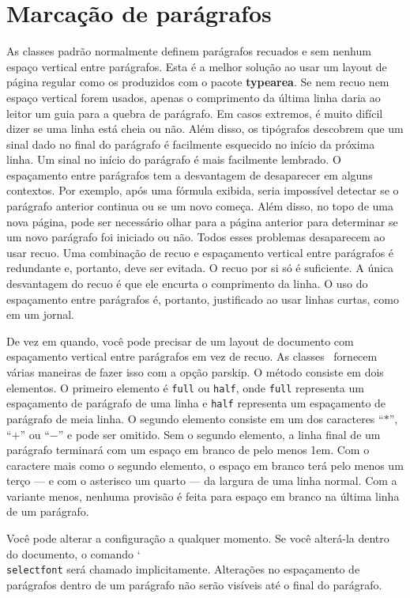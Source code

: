 \chapter{Marcação de parágrafos}
As classes padrão normalmente definem parágrafos recuados e sem nenhum espaço vertical entre parágrafos. Esta é a melhor solução ao usar um layout de página regular como os produzidos com o pacote \textbf{typearea}. Se nem recuo nem espaço vertical forem usados, apenas o comprimento da última linha daria ao leitor um guia para a quebra de parágrafo. Em casos extremos, é muito difícil dizer se uma linha está cheia ou não. Além disso, os tipógrafos descobrem que um sinal dado no final do parágrafo é facilmente esquecido no início da próxima linha. Um sinal no início do parágrafo é mais facilmente lembrado. O espaçamento entre parágrafos tem a desvantagem de desaparecer em alguns contextos. Por exemplo, após uma fórmula exibida, seria impossível detectar se o parágrafo anterior continua ou se um novo começa. Além disso, no topo de uma nova página, pode ser necessário olhar para a página anterior para determinar se um novo parágrafo foi iniciado ou não. Todos esses problemas desaparecem ao usar recuo. Uma combinação de recuo e espaçamento vertical entre parágrafos é redundante e, portanto, deve ser evitada. O recuo por si só é suficiente. A única desvantagem do recuo é que ele encurta o comprimento da linha. O uso do espaçamento entre parágrafos é, portanto, justificado ao usar linhas curtas, como em um jornal.

De vez em quando, você pode precisar de um layout de documento com espaçamento vertical entre parágrafos em vez de recuo. As classes \KOMAScript\ fornecem várias maneiras de fazer isso com a opção parskip. O método consiste em dois elementos. O primeiro elemento é \texttt{full} ou \texttt{half}, onde \texttt{full} representa um espaçamento de parágrafo de uma linha e \texttt{half} representa um espaçamento de parágrafo de meia linha. O segundo elemento consiste em um dos caracteres ``$\ast$'', ``$+$'' ou ``$-$'' e pode ser omitido. Sem o segundo elemento, a linha final de um parágrafo terminará com um espaço em branco de pelo menos 1em. Com o caractere mais como o segundo elemento, o espaço em branco terá pelo menos um terço --- e com o asterisco um quarto --- da largura de uma linha normal. Com a variante menos, nenhuma provisão é feita para espaço em branco na última linha de um parágrafo.

Você pode alterar a configuração a qualquer momento. Se você alterá-la dentro do documento, o comando \char`\\\texttt{se\-lect\-font} será chamado implicitamente. Alterações no espaçamento de parágrafos dentro de um parágrafo não serão visíveis até o final do parágrafo.

